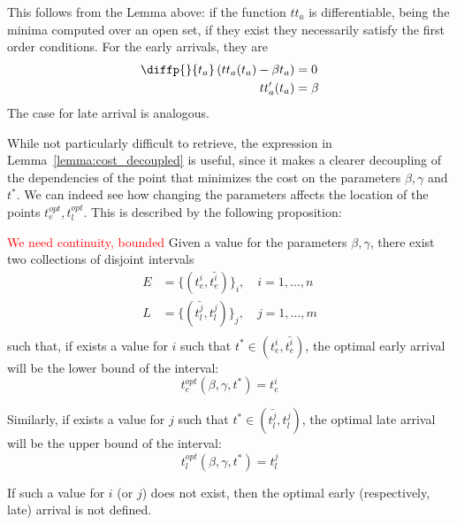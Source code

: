 This follows from the Lemma above:
if the function \(tt_a\) is differentiable, being the minima computed over an open set,
if they exist they necessarily satisfy the first order conditions.
For the early arrivals, they are
\begin{align*}
  \diffp{}{{t_a}} \left(tt_a(t_a) - \beta t_a\right) & = 0 \\
  tt_a'(t_a) & = \beta
\end{align*}
The case for late arrival is analogous.

While not particularly difficult to retrieve,
the expression in Lemma~\ref{lemma:cost_decoupled} is useful,
since it makes a clearer decoupling of the dependencies of the point that minimizes the cost on the parameters \(\beta, \gamma\) and \(t^*\).
We can indeed see how changing the parameters affects the location of the points \(t_e^{opt}, t_l^{opt}\).
This is described by the following proposition:
\begin{prop}
  \label{prop:into-early-late}
  \textcolor{red}{We need continuity, bounded}
  Given a value for the parameters \(\beta, \gamma\),
  there exist two collections of disjoint intervals
  \begin{align*}
    E & = \{(t_e^i, \bar{t_e^i})\}_i,\quad i = 1, \dots, n \\
    L & = \{(\bar{t_l^j}, t_l^j)\}_j,\quad j = 1, \dots, m \\
  \end{align*}
  such that, if exists a value for \(i\) such that \(t^* \in (t_e^i, \bar{t_e^i})\),
  the optimal early arrival will be the lower bound of the interval:
  \begin{equation*}
    t_e^{opt}(\beta, \gamma, t^*) = t_e^{i}
  \end{equation*}

  Similarly, if exists a value for \(j\) such that \(t^* \in (\bar{t_l^j}, t_l^j)\),
  the optimal late arrival will be the upper bound of the interval:
  \begin{equation*}
    t_l^{opt}(\beta, \gamma, t^*) = t_l^{j}
  \end{equation*}

  If such a value for \(i\) (or \(j\)) does not exist,
  then the optimal early (respectively, late) arrival is not defined.
\end{prop}

